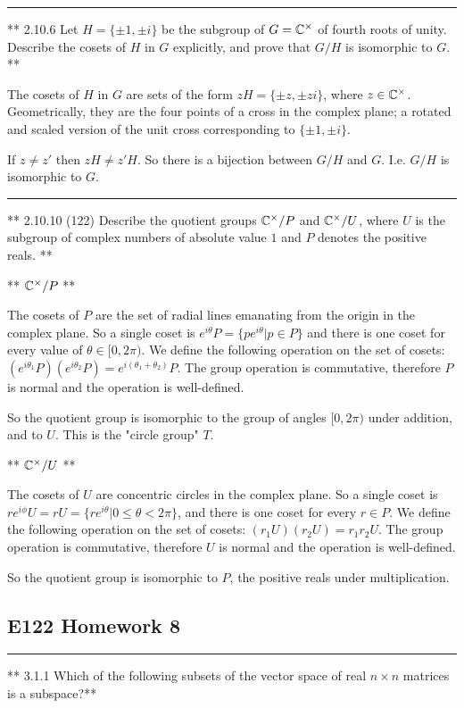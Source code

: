 \hrule

** 2.10.6 Let $H = \{±1, ±i\}$ be the subgroup of $G = \mathbb{C}^\times$ of fourth roots
of unity. Describe the cosets of $H$ in $G$ explicitly, and prove that $G/H$ is
isomorphic to $G$. **

The cosets of $H$ in $G$ are sets of the form $zH = \{±z, ±zi\}$, where $z \in
\mathbb{C}^\times$. Geometrically, they are the four points of a cross in the complex
plane; a rotated and scaled version of the unit cross corresponding to $\{±1,
±i\}$.

If $z \neq z'$ then $zH \neq z'H$. So there is a bijection between $G/H$ and
$G$. I.e. $G/H$ is isomorphic to $G$.

\hrule

** 2.10.10 (122) Describe the quotient groups $\mathbb{C}^\times / P$ and $\mathbb{C}^\times /
U$, where $U$ is the subgroup of complex numbers of absolute value $1$ and $P$
denotes the positive reals. **

** $\mathbb{C}^\times / P$ **

The cosets of $P$ are the set of radial lines emanating from the origin in the
complex plane. So a single coset is $e^{i\theta}P = \{pe^{i\theta} | p \in P\}$
and there is one coset for every value of $\theta \in [0, 2\pi)$. We define the
following operation on the set of cosets:
$(e^{i\theta_1}P)(e^{i\theta_2}P) = e^{i(\theta_1 + \theta_2)}P$. The group operation is commutative, therefore $P$ is normal and the operation is well-defined.

So the quotient group is isomorphic to the group of angles $[0, 2\pi)$ under addition, and to $U$. This is the "circle group" $T$.


** $\mathbb{C}^\times / U$ **

The cosets of $U$ are concentric circles in the complex plane. So a single coset is $re^{i\phi}U = rU = \{re^{i\theta}|0\leq\theta<2\pi\}$, and there is one coset for every $r \in P$. We define the
following operation on the set of cosets: $(r_1U)(r_2U) = r_1r_2U$. The group operation is commutative, therefore $U$ is normal and the operation is well-defined.

So the quotient group is isomorphic to $P$, the positive reals under multiplication.

\subsection{E122 Homework 8}


\hrule

** 3.1.1 Which of the following subsets of the vector space of real $n \times
n$ matrices is a subspace?**


